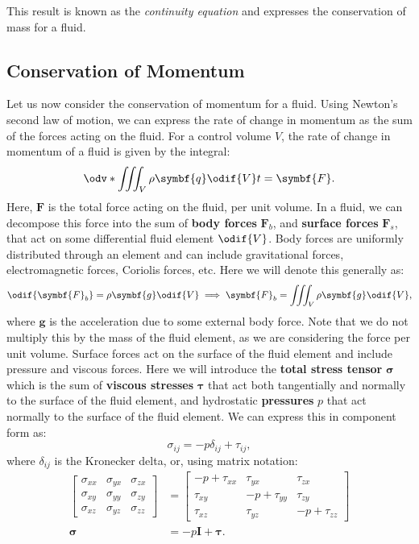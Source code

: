 \documentclass{article}
\theoremstyle{definition}
\begin{document}
This result is known as the \textit{continuity equation} and expresses
the conservation of mass for a fluid.
\subsection{Conservation of Momentum}
Let us now consider the conservation of momentum for a fluid. Using
Newton's second law of motion, we can express the rate of change in
momentum as the sum of the forces acting on the fluid. For a control
volume \(V\), the rate of change in momentum of a fluid is given by the
integral:
\begin{equation*}
    \odv*{\iiint_V \rho \symbf{q} \odif{V}}{t} = \symbf{F}.
\end{equation*}
Here, \(\symbf{F}\) is the total force acting on the fluid, per unit
volume. In a fluid, we can decompose this force into the sum of
\textbf{body forces} \(\symbf{F}_b\), and \textbf{surface forces}
\(\symbf{F}_s\), that act on some differential fluid element \(\odif{V}\).
Body forces are uniformly distributed through an element and can
include gravitational forces, electromagnetic forces, Coriolis forces,
etc. Here we will denote this generally as:
\begin{equation*}
    \odif{\symbf{F}_b} = \rho \symbf{g} \odif{V} \implies \symbf{F}_b = \iiint_V \rho \symbf{g} \odif{V},
\end{equation*}
where \(\symbf{g}\) is the acceleration due to some external body force.
Note that we do not multiply this by the mass of the fluid element, as
we are considering the force per unit volume. Surface forces act on the
surface of the fluid element and include pressure and viscous forces.
Here we will introduce the \textbf{total stress tensor} \(\symbf{\sigma}\)
which is the sum of \textbf{viscous stresses} \(\symbf{\tau}\) that
act both tangentially and normally to the surface of the fluid element,
and hydrostatic \textbf{pressures} \(p\) that act normally to the
surface of the fluid element. We can express this in component form as:
\begin{equation*}
    \sigma_{ij} = -p \delta_{ij} + \tau_{ij},
\end{equation*}
where \(\delta_{ij}\) is the Kronecker delta, or, using matrix notation:
\begin{align*}
    \begin{bmatrix}
        \sigma_{xx} & \sigma_{yx} & \sigma_{zx} \\
        \sigma_{xy} & \sigma_{yy} & \sigma_{zy} \\
        \sigma_{xz} & \sigma_{yz} & \sigma_{zz}
    \end{bmatrix}
                   & =
    \begin{bmatrix}
        -p + \tau_{xx} & \tau_{yx}      & \tau_{zx}      \\
        \tau_{xy}      & -p + \tau_{yy} & \tau_{zy}      \\
        \tau_{xz}      & \tau_{yz}      & -p + \tau_{zz}
    \end{bmatrix}
    \\
    \symbf{\sigma} & = -p \symbf{I} + \symbf{\tau}.
\end{align*}
\end{document}
